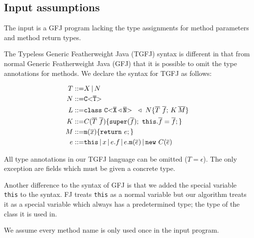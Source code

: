 \documentclass[acmsmall,screen,review]{acmart}
\begin{document}
\subsection{Input assumptions}
The input is a GFJ program lacking the type assignments for method parameters and method return types.


The Typeless Generic Featherweight Java (TGFJ) syntax is different in that from normal Generic Featherweight Java (GFJ) that it is possible
to omit the type annotations for methods.%
We declare the syntax for TGFJ as follows:

\begin{align*}
  T ::=& X \, | \, N \\
  N ::=& \mathtt{C {\tt <} \overline{T} {\tt >} \ }\\
  L ::=& \mathtt{class } \ \mathtt{C {\tt <} \overline{X} \triangleleft \overline{N} {\tt >} \ } \ \triangleleft \ N \{ \overline{T} \ \overline{f}; \, K \, \overline{M} \} \\
  K ::=& C(\overline{T} \ \overline{f})\{\mathtt{super}(\overline{f}); \ \mathtt{this}.\overline{f}=\overline{f};\} \\
  M ::=& \mathtt{m}(\overline{x})\{ \mathtt{ return }\ e; \} \\
  e ::=& \mathtt{this} \, | \, x \, | \, e.f \, | \, e.\mathtt{m}(\overline{e}) \, | \, \mathtt{new }\ C(\overline{e})
\end{align*}

All type annotations in our TGFJ language can be omitted ($T = \epsilon$).
The only exception are fields which must be given a concrete type.

Another difference to the syntax of GFJ is that we added the special variable \texttt{this} to the syntax.
FJ treats \texttt{this} as a normal variable
but our algorithm treats it as a special variable which always has a predetermined type;
the type of the class it is used in.

We assume every method name is only used once in the input program.
\end{document}
